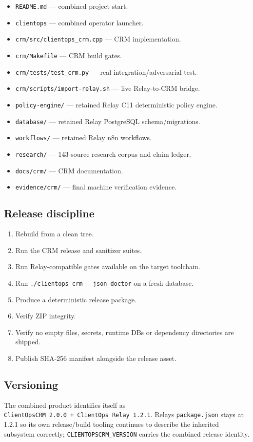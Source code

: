 \documentclass[
]{article}
\providecommand{\tightlist}{%
  \setlength{\itemsep}{0pt}\setlength{\parskip}{0pt}}
\begin{document}
\begin{itemize}
\tightlist
\item
  \texttt{README.md} --- combined project start.
\item
  \texttt{clientops} --- combined operator launcher.
\item
  \texttt{crm/src/clientops\_crm.cpp} --- CRM implementation.
\item
  \texttt{crm/Makefile} --- CRM build gates.
\item
  \texttt{crm/tests/test\_crm.py} --- real integration/adversarial test.
\item
  \texttt{crm/scripts/import-relay.sh} --- live Relay-to-CRM bridge.
\item
  \texttt{policy-engine/} --- retained Relay C11 deterministic policy
  engine.
\item
  \texttt{database/} --- retained Relay PostgreSQL schema/migrations.
\item
  \texttt{workflows/} --- retained Relay n8n workflows.
\item
  \texttt{research/} --- 143-source research corpus and claim ledger.
\item
  \texttt{docs/crm/} --- CRM documentation.
\item
  \texttt{evidence/crm/} --- final machine verification evidence.
\end{itemize}

\subsection{Release discipline}\label{release-discipline}

\begin{enumerate}
\def\labelenumi{\arabic{enumi}.}
\tightlist
\item
  Rebuild from a clean tree.
\item
  Run the CRM release and sanitizer suites.
\item
  Run Relay-compatible gates available on the target toolchain.
\item
  Run \texttt{./clientops\ crm\ -\/-json\ doctor} on a fresh database.
\item
  Produce a deterministic release package.
\item
  Verify ZIP integrity.
\item
  Verify no empty files, secrets, runtime DBs or dependency directories
  are shipped.
\item
  Publish SHA-256 manifest alongside the release asset.
\end{enumerate}

\subsection{Versioning}\label{versioning}

The combined product identifies itself as
\texttt{ClientOpsCRM\ 2.0.0\ +\ ClientOps\ Relay\ 1.2.1}.
Relay\textquotesingle s \texttt{package.json} stays at 1.2.1 so its own
release/build tooling continues to describe the inherited subsystem
correctly; \texttt{CLIENTOPSCRM\_VERSION} carries the combined release
identity.
\end{document}
